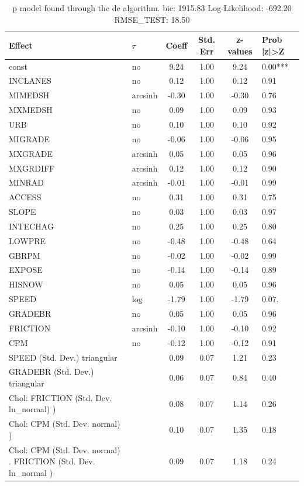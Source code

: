 \begin{table}
	\caption{p model found through the de algorithm. bic: 1915.83 Log-Likelihood: -692.20 RMSE_TEST: 18.50}
	\begin{center}
		\begin{tabular}{|l|l|c|c|c|l|}
			\hline
			Effect & $\tau$ & Coeff & Std. Err & z-values & Prob |z|>Z \\
			\hline
			const & no & 9.24 & 1.00 & 9.24 & 0.00*** \\
			\hline
			INCLANES & no & 0.12 & 1.00 & 0.12 & 0.91 \\
			\hline
			MIMEDSH & arcsinh & -0.30 & 1.00 & -0.30 & 0.76 \\
			\hline
			MXMEDSH & no & 0.09 & 1.00 & 0.09 & 0.93 \\
			\hline
			URB & no & 0.10 & 1.00 & 0.10 & 0.92 \\
			\hline
			MIGRADE & no & -0.06 & 1.00 & -0.06 & 0.95 \\
			\hline
			MXGRADE & arcsinh & 0.05 & 1.00 & 0.05 & 0.96 \\
			\hline
			MXGRDIFF & arcsinh & 0.12 & 1.00 & 0.12 & 0.90 \\
			\hline
			MINRAD & arcsinh & -0.01 & 1.00 & -0.01 & 0.99 \\
			\hline
			ACCESS & no & 0.31 & 1.00 & 0.31 & 0.75 \\
			\hline
			SLOPE & no & 0.03 & 1.00 & 0.03 & 0.97 \\
			\hline
			INTECHAG & no & 0.25 & 1.00 & 0.25 & 0.80 \\
			\hline
			LOWPRE & no & -0.48 & 1.00 & -0.48 & 0.64 \\
			\hline
			GBRPM & no & -0.02 & 1.00 & -0.02 & 0.99 \\
			\hline
			EXPOSE & no & -0.14 & 1.00 & -0.14 & 0.89 \\
			\hline
			HISNOW & no & 0.05 & 1.00 & 0.05 & 0.96 \\
			\hline
			SPEED & log & -1.79 & 1.00 & -1.79 & 0.07. \\
			\hline
			GRADEBR & no & 0.05 & 1.00 & 0.05 & 0.96 \\
			\hline
			FRICTION & arcsinh & -0.10 & 1.00 & -0.10 & 0.92 \\
			\hline
			CPM & no & -0.12 & 1.00 & -0.12 & 0.91 \\
			\hline
			SPEED (Std. Dev.) triangular &  & 0.09 & 0.07 & 1.21 & 0.23 \\
			\hline
			GRADEBR (Std. Dev.) triangular &  & 0.06 & 0.07 & 0.84 & 0.40 \\
			\hline
			 Chol: FRICTION (Std. Dev. ln_normal) ) &  & 0.08 & 0.07 & 1.14 & 0.26 \\
			\hline
			 Chol: CPM (Std. Dev. normal) ) &  & 0.10 & 0.07 & 1.35 & 0.18 \\
			\hline
			 Chol: CPM (Std. Dev. normal) . FRICTION (Std. Dev.   ln_normal ) &  & 0.09 & 0.07 & 1.18 & 0.24 \\
			\hline
		\end{tabular}
	\end{center}
\end{table}
